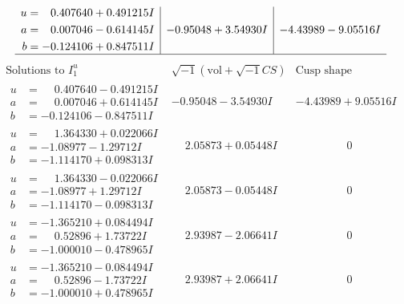 \documentclass[1p]{elsarticle_modified}
\theoremstyle{definition}
\newcommand{\I}{\sqrt{-1}}
\begin{document}
$$\begin{array}{c|c|c}
\begin{aligned}
u &= \phantom{-}0.407640 + 0.491215 I \\
a &= \phantom{-}0.007046 - 0.614145 I \\
b &= -0.124106 + 0.847511 I\end{aligned}
 & -0.95048 + 3.54930 I & -4.43989 - 9.05516 I\\
 \hline 
 \end{array}$$\newpage$$\begin{array}{c|c|c}  
\text{Solutions to }I^u_{1}& \I (\text{vol} + \sqrt{-1}CS) & \text{Cusp shape}\\
 \hline 
\begin{aligned}
u &= \phantom{-}0.407640 - 0.491215 I \\
a &= \phantom{-}0.007046 + 0.614145 I \\
b &= -0.124106 - 0.847511 I\end{aligned}
 & -0.95048 - 3.54930 I & -4.43989 + 9.05516 I \\ \hline\begin{aligned}
u &= \phantom{-}1.364330 + 0.022066 I \\
a &= -1.08977 - 1.29712 I \\
b &= -1.114170 + 0.098313 I\end{aligned}
 & \phantom{-}2.05873 + 0.05448 I & \phantom{-0.000000 } 0 \\ \hline\begin{aligned}
u &= \phantom{-}1.364330 - 0.022066 I \\
a &= -1.08977 + 1.29712 I \\
b &= -1.114170 - 0.098313 I\end{aligned}
 & \phantom{-}2.05873 - 0.05448 I & \phantom{-0.000000 } 0 \\ \hline\begin{aligned}
u &= -1.365210 + 0.084494 I \\
a &= \phantom{-}0.52896 + 1.73722 I \\
b &= -1.000010 - 0.478965 I\end{aligned}
 & \phantom{-}2.93987 - 2.06641 I & \phantom{-0.000000 } 0 \\ \hline\begin{aligned}
u &= -1.365210 - 0.084494 I \\
a &= \phantom{-}0.52896 - 1.73722 I \\
b &= -1.000010 + 0.478965 I\end{aligned}
 & \phantom{-}2.93987 + 2.06641 I & \phantom{-0.000000 } 0 \\ \hline\begin{aligned}

\end{aligned}
\end{array}$$
\end{document}
